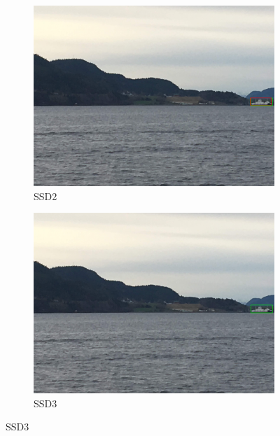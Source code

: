 \begin{figure}[h!]
\begin{subfigure}{.5\textwidth}
  \centering
  \includegraphics[width=0.8\linewidth]{results/case_buildings/ssdtrf/ssd2/2better/IMG_2273.jpg}
  \caption{SSD2}
\end{subfigure}%
\begin{subfigure}{.5\textwidth}
  \centering
  \includegraphics[width=.8\linewidth]{results/case_buildings/ssdtrf/ssd3/2better/IMG_2273.jpg}
  \caption{SSD3}
\end{subfigure}


\end{figure}
